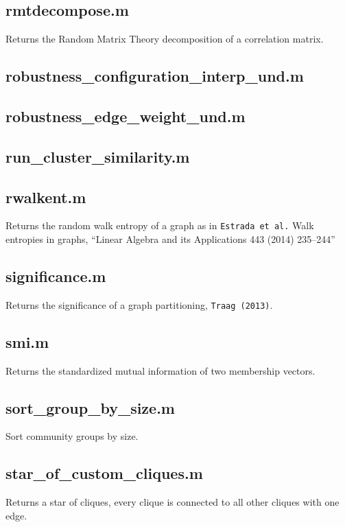 \begin{itemize}[<+->]
  \subsection*{rmtdecompose.m} Returns the Random Matrix Theory decomposition
  of a correlation matrix.

  \subsection*{robustness\_configuration\_interp\_und.m}

  \subsection*{robustness\_edge\_weight\_und.m}

  \subsection*{run\_cluster\_similarity.m}

  \subsection*{rwalkent.m} Returns the random walk entropy of a graph as in
  \texttt{Estrada\ et\ al.} Walk entropies in graphs, ``Linear Algebra
  and its Applications 443 (2014) 235--244''

  \subsection*{significance.m} Returns the significance of a graph
  partitioning, \texttt{Traag\ (2013)}.

  \subsection*{smi.m} Returns the standardized mutual information of two
  membership vectors.

  \subsection*{sort\_group\_by\_size.m} Sort community groups by size.

  \subsection*{star\_of\_custom\_cliques.m} Returns a star of cliques, every
  clique is connected to all other cliques with one edge.


\end{itemize}
